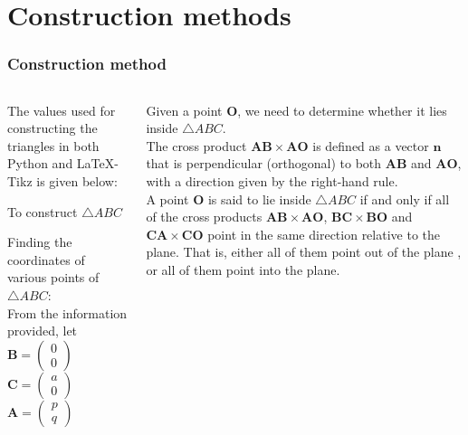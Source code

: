 \documentclass{beamer}
\renewcommand{\vec}[1]{\mathbf{#1}}
\begin{document}
\section*{Construction methods}
\begin{frame}[fragile]
\footnotesize
\frametitle{Construction method}
\begin{columns}
\begin{column}{0.5\textwidth}
The values used for constructing the triangles in both Python and \LaTeX{}-Tikz is given below:
\begin{table}[ht]
    \begin{center}
    	
  \caption{To construct $\triangle ABC$}
   \label{table:table1}
   \end{center}	
\end{table}

Finding the coordinates of various points of  $\triangle ABC$:\\
From the information provided, let\\
    \quad $ \vec{B}= \begin{pmatrix}0\\0\end{pmatrix}$
    \quad $\vec{C}=\begin{pmatrix}a\\0\end{pmatrix}$
    \quad $\vec{A}=\begin{pmatrix}p\\q\end{pmatrix}$
 \end{column}
\begin{column}{0.5\textwidth}   
    Given a point $\vec{O}$, we need to determine whether it lies inside $\triangle ABC$.\\The cross product $\vec{AB} \times \vec{AO}$ is defined as a vector $\vec{n}$ that is perpendicular (orthogonal) to both $\vec{AB}$ and $\vec{AO}$, with a direction given by the right-hand rule.\\ A point $\vec{O}$ is said to lie inside $\triangle ABC$ if and only if all of the cross products $\vec{AB} \times \vec{AO}$, $\vec{BC} \times \vec{BO}$  and $\vec{CA} \times \vec{CO}$ point in the same direction relative to the plane. That is, either all of them point out of the plane , or all of them point into the plane. 
   

 
 
    
\end{column}
\end{columns}
\end{frame}
\end{document}
